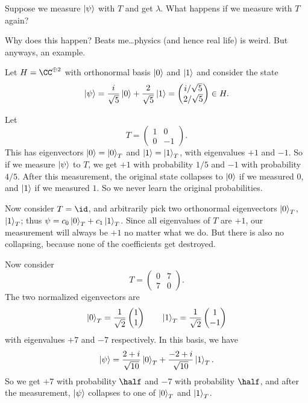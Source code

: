 \documentclass[11pt]{scrreprt}
\begin{document}
\begin{ques}
	Suppose we measure $\ket\psi$ with $T$ and get $\lambda$.
	What happens if we measure with $T$ again?
\end{ques}
Why does this happen? Beats me\dots physics (and hence real life) is weird.
But anyways, an example.
\begin{example}
	Let $H = \CC^{\oplus 2}$ with orthonormal basis $\ket0$ and $\ket1$
	and consider the state
	\[
		\ket\psi
		= \frac{i}{\sqrt5} \ket 0
		+ \frac{2}{\sqrt5} \ket 1
		= \begin{pmatrix} i/\sqrt5 \\ 2/\sqrt5 \end{pmatrix} \in H.
	\]
	\begin{enumerate}[(a)]
		\ii Let \[ T = \begin{pmatrix} 1 & 0 \\ 0 & -1 \end{pmatrix}. \]
		This has eigenvectors $\ket0 = \ket0_T$ and $\ket1 = \ket1_T$,
		with eigenvalues $+1$ and $-1$.  So if we measure $\ket\psi$ to $T$,
		we get $+1$ with probability $1/5$ and $-1$ with probability $4/5$.
		After this measurement, the original state collapses to
		$\ket0$ if we measured $0$, and $\ket1$ if we measured $1$.
		So we never learn the original probabilities.

		\ii Now consider $T = \id$, and arbitrarily
		pick two orthonormal eigenvectors $\ket0_T$, $\ket1_T$;
		thus $\psi = c_0\ket0_T + c_1\ket1_T$.
		Since all eigenvalues of $T$ are $+1$,
		our measurement will always be $+1$ no matter what we do.
		But there is also no collapsing,
		because none of the coefficients get destroyed.

		\ii Now consider
		\[ T = \begin{pmatrix} 0 & 7 \\ 7 & 0 \end{pmatrix}. \]
		The two normalized eigenvectors are
		\[ \ket0_T = \frac{1}{\sqrt2}\begin{pmatrix} 1 \\ 1 \end{pmatrix}
		\qquad \ket1_T = \frac{1}{\sqrt2}\begin{pmatrix} 1 \\ -1 \end{pmatrix} \]
		with eigenvalues $+7$ and $-7$ respectively. In this basis, we have
		\[
			\ket\psi = \frac{2+i}{\sqrt{10}}\ket0_T
			+ \frac{-2+i}{\sqrt{10}}\ket1_T. \]
		So we get $+7$ with probability $\half$ and $-7$
		with probability $\half$, and after the measurement,
		$\ket\psi$ collapses to one of $\ket0_T$ and $\ket1_T$.
	\end{enumerate}
\end{example}
\end{document}
